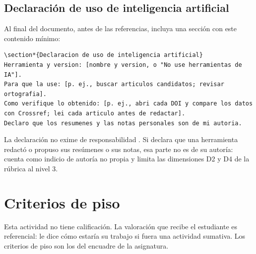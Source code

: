 \documentclass[11pt,a4paper]{article}
\begin{document}
\subsection{Declaración de uso de inteligencia artificial}\label{sec:ia}

Al final del documento, antes de las referencias, incluya una sección con este contenido mínimo:

\begin{lstlisting}
\section*{Declaracion de uso de inteligencia artificial}
Herramienta y version: [nombre y version, o "No use herramientas de IA"].
Para que la use: [p. ej., buscar articulos candidatos; revisar ortografia].
Como verifique lo obtenido: [p. ej., abri cada DOI y compare los datos
con Crossref; lei cada articulo antes de redactar].
Declaro que los resumenes y las notas personales son de mi autoria.
\end{lstlisting}

La declaración no exime de responsabilidad \cite{acm2018ethics}. Si declara que una herramienta redactó o propuso sus resúmenes o sus notas, esa parte no es de su autoría: cuenta como indicio de autoría no propia y limita las dimensiones D2 y D4 de la rúbrica al nivel 3.

\section{Criterios de piso}

Esta actividad no tiene calificación. La valoración que recibe el estudiante es referencial: le dice cómo estaría su trabajo si fuera una actividad sumativa. Los criterios de piso son los del encuadre de la asignatura.
\end{document}
